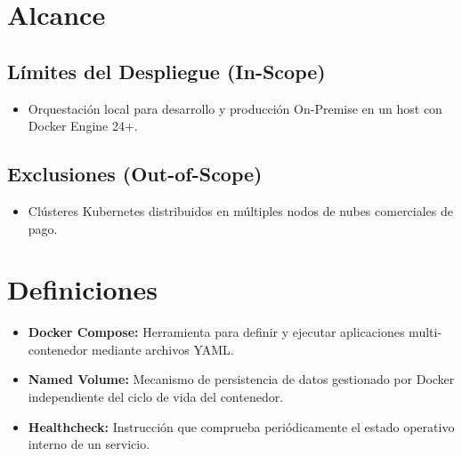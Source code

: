 \documentclass[12pt,a4paper]{article}
\begin{document}
\section{Alcance}

\subsection{Límites del Despliegue (In-Scope)}
\begin{itemize}[leftmargin=1.5em, itemsep=2pt]
    \item Orquestación local para desarrollo y producción On-Premise en un host con Docker Engine 24+.
\end{itemize}

\subsection{Exclusiones (Out-of-Scope)}
\begin{itemize}[leftmargin=1.5em, itemsep=2pt]
    \item Clústeres Kubernetes distribuidos en múltiples nodos de nubes comerciales de pago.
\end{itemize}

\section{Definiciones}
\begin{itemize}[leftmargin=1.5em, itemsep=2pt]
    \item \textbf{Docker Compose:} Herramienta para definir y ejecutar aplicaciones multi-contenedor mediante archivos YAML.
    \item \textbf{Named Volume:} Mecanismo de persistencia de datos gestionado por Docker independiente del ciclo de vida del contenedor.
    \item \textbf{Healthcheck:} Instrucción que comprueba periódicamente el estado operativo interno de un servicio.
\end{itemize}
\end{document}
